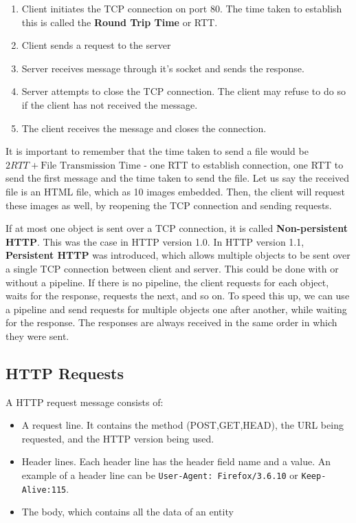 \documentclass[12pt,letterpaper]{article}
\theoremstyle{definition}
\begin{document}
\begin{enumerate}
  \item Client initiates the TCP connection on port 80. The time taken to establish this is called the \textbf{Round Trip Time} or RTT. 
  \item Client sends a request to the server
  \item Server receives message through it's socket and sends the response.
  \item Server attempts to close the TCP connection. The client may refuse to do so if the client has not received the message.
  \item The client receives the message and closes the connection.
\end{enumerate}

It is important to remember that the time taken to send a file would be $2RTT + \text{File Transmission Time}$ - one RTT to establish connection, one RTT to send the first message and the time taken to send the file. Let us say the received file is an HTML file, which as 10 images embedded. Then, the client will request these images as well, by reopening the TCP connection and sending requests.

If at most one object is sent over a TCP connection, it is called \textbf{Non-persistent HTTP}. This was the case in HTTP version 1.0. In HTTP version 1.1, \textbf{Persistent HTTP} was introduced, which allows multiple objects to be sent over a single TCP connection between client and server. This could be done with or without a pipeline. If there is no pipeline, the client requests for each object, waits for the response, requests the next, and so on. To speed this up, we can use a pipeline and send requests for multiple objects one after another, while waiting for the response. The responses are always received in the same order in which they were sent.

\subsection{HTTP Requests}

A HTTP request message consists of:

\begin{itemize}
  \item A request line. It contains the method (POST,GET,HEAD), the URL being requested, and the HTTP version being used.
  \item Header lines. Each header line has the header field name and a value. An example of a header line can be \texttt{User-Agent: Firefox/3.6.10} or \texttt{Keep-Alive:115}.
  \item The body, which contains all the data of an entity
\end{itemize}
\end{document}
